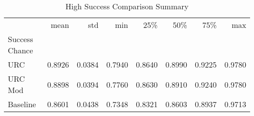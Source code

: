 \begin{table}
\caption{High Success Comparison Summary}
\begin{tabular}{lrrrrrrr}
\toprule
 & mean & std & min & 25\% & 50\% & 75\% & max \\
Success Chance &  &  &  &  &  &  &  \\
\midrule
URC & 0.8926 & 0.0384 & 0.7940 & 0.8640 & 0.8990 & 0.9225 & 0.9780 \\
URC Mod & 0.8898 & 0.0394 & 0.7760 & 0.8630 & 0.8910 & 0.9240 & 0.9780 \\
Baseline & 0.8601 & 0.0438 & 0.7348 & 0.8321 & 0.8603 & 0.8937 & 0.9713 \\
\bottomrule
\end{tabular}
\end{table}
